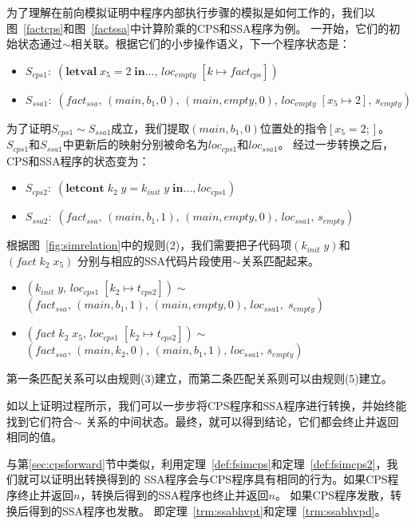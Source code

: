 为了理解在前向模拟证明中程序内部执行步骤的模拟是如何工作的，我们以图~\ref{factcps}和图~\ref{factssa}中计算阶乘的CPS和SSA程序为例。
一开始，它们的初始状态通过$\sim$相关联。根据它们的小步操作语义，下一个程序状态是：
\begin{itemize}
    \item $S_{cps1}:\; (\mathbf{letval}\; x_5=2\; \mathbf{in}\dots,\, loc_{empty}\; [k\mapsto fact_{cps}])$
    \item $S_{ssa1}:\; (fact_{ssa},\, (main, b_1, 0),\, (main, empty, 0),\, loc_{empty}\; [x_5\mapsto 2],\, s_{empty})$
\end{itemize}
为了证明$S_{cps1}\sim S_{ssa1}$成立，我们提取$(main, b_1, 0)$位置处的指令$[x_5 = 2;]$。
$S_{cps1}$和$S_{ssa1}$中更新后的映射分别被命名为$loc_{cps1}$和$loc_{ssa1}$。
经过一步转换之后，CPS和SSA程序的状态变为：
\begin{itemize}
    \item $S_{cps2}:\; (\mathbf{letcont}\; k_2\; y=k_{init}\; y\; \mathbf{in}\dots, loc_{cps1})$
    \item $S_{ssa2}:\; (fact_{ssa},\, (main, b_1, 1),\, (main, empty, 0),\, loc_{ssa1},\, s_{empty})$
\end{itemize}
根据图~\ref{fig:simrelation}中的规则(2)，我们需要把子代码项$(k_{init}\; y)$和$(fact\; k_2\; x_5)$
分别与相应的SSA代码片段使用$\sim$关系匹配起来。
\begin{itemize}
    \item $(k_{init}\; y,\, loc_{cps1}\; [k_2\mapsto t_{cps2}])\sim $ \\ $(fact_{ssa},\, (main, b_1, 1),\, (main, empty, 0),\, loc_{ssa1},\; s_{empty})$
    \item $ (fact\; k_2\; x_5,\, loc_{cps1}\; [k_2\mapsto t_{cps2}])\sim $ \\ $(fact_{ssa},\, (main, k_2, 0),\, (main, b_1,1),\, loc_{ssa1},\, s_{empty})$
\end{itemize}
第一条匹配关系可以由规则(3)建立，而第二条匹配关系则可以由规则(5)建立。

如以上证明过程所示，我们可以一步步将CPS程序和SSA程序进行转换，并始终能找到它们符合$\sim$
关系的中间状态。最终，就可以得到结论，它们都会终止并返回相同的值。

与第\ref{sec:cpsforward}节中类似，利用定理~\ref{def:fsimcps}和定理~\ref{def:fsimcps2}，我们就可以证明出转换得到的
SSA程序会与CPS程序具有相同的行为。如果CPS程序终止并返回$n$，转换后得到的SSA程序也终止并返回$n$。
如果CPS程序发散，转换后得到的SSA程序也发散。
即定理~\ref{trm:ssabhvpt}和定理~\ref{trm:ssabhvpd}。

